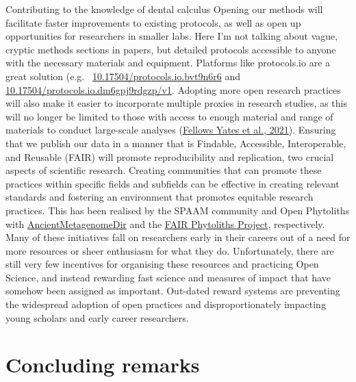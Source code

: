\documentclass[
  letterpaper,
]{book}
\begin{document}
Contributing to the knowledge of dental calculus Opening our methods
will facilitate faster improvements to existing protocols, as well as
open up opportunities for researchers in smaller labs. Here I'm not
talking about vague, cryptic methods sections in papers, but detailed
protocols accessible to anyone with the necessary materials and
equipment. Platforms like protocols.io are a great solution (e.g.~
\href{dx.doi.org/10.17504/protocols.io.bvt9n6r6}{10.17504/protocols.io.bvt9n6r6}
and
\href{dx.doi.org/10.17504/protocols.io.dm6gpj9rdgzp/v1}{10.17504/protocols.io.dm6gpj9rdgzp/v1}.
Adopting more open research practices will also make it easier to
incorporate multiple proxies in research studies, as this will no longer
be limited to those with access to enough material and range of
materials to conduct large-scale analyses
(\protect\hyperlink{ref-yatesOralMicrobiome2021}{Fellows Yates et al.,
2021}). Ensuring that we publish our data in a manner that is Findable,
Accessible, Interoperable, and Reusable (FAIR) will promote
reproducibility and replication, two crucial aspects of scientific
research. Creating communities that can promote these practices within
specific fields and subfields can be effective in creating relevant
standards and fostering an environment that promotes equitable research
practices. This has been realised by the SPAAM community and Open
Phytoliths with
\href{https://zenodo.org/record/7789069}{AncientMetagenomeDir} and the
\href{https://zenodo.org/record/6435441}{FAIR Phytoliths Project},
respectively. Many of these initiatives fall on researchers early in
their careers out of a need for more resources or sheer enthusiasm for
what they do. Unfortunately, there are still very few incentives for
organising these resources and practicing Open Science, and instead
rewarding fast science and measures of impact that have somehow been
assigned as important. Out-dated reward systems are preventing the
widespread adoption of open practices and disproportionately impacting
young scholars and early career researchers.

\hypertarget{concluding-remarks}{%
\section{Concluding remarks}\label{concluding-remarks}}
\end{document}
